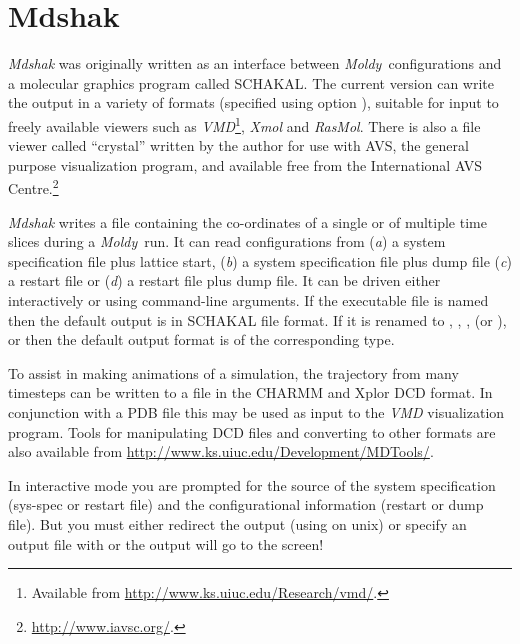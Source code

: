 \documentclass[a4paper,twoside]{report}
\newcommand{\moldy}{\emph{Moldy}}
\begin{document}
\section{Mdshak}%
\emph{Mdshak} was originally written as an interface between \moldy\ 
configurations and a molecular graphics program called
SCHAKAL\cite{schakal:88}.  The current version can write the output in
a variety of formats (specified using option \Lit{-f}), suitable
for input to freely available viewers such as
\emph{VMD}\footnote{Available from
  \url{http://www.ks.uiuc.edu/Research/vmd/}.}, \emph{Xmol} and
\emph{RasMol}.  There is also a file viewer called
``crystal'' written by the author for use with AVS, the general
purpose visualization program, and available free from the
International AVS Centre.\footnote{\url{http://www.iavsc.org/}.}

\emph{Mdshak} writes a file containing the co-ordinates of a
single or of multiple time slices during a \moldy\ run.  It can read
configurations from (\emph{a}) a system specification file plus
lattice start, (\emph{b}) a system specification file plus dump file
(\emph{c}) a restart file or (\emph{d}) a restart file plus dump file.
It can be driven either interactively or using command-line arguments.
If the executable file is named \Fname{mdshak} then the default output
is in SCHAKAL file format. If it is renamed to \Fname{mdxyz},
, ,  (or ),
\Fname{mdarc} or \Fname{mdxtl} then the default output format
is of the corresponding type.

To assist in making animations of a simulation, the trajectory from
many timesteps can be written to a file in the  CHARMM and Xplor DCD
format.  In conjunction with a PDB file
this may be used as input to the \emph{VMD} visualization program.  Tools for
manipulating DCD files and converting to other formats are also
available from \url{http://www.ks.uiuc.edu/Development/MDTools/}.

In interactive mode you are prompted for the source of the system
specification (sys-spec or restart file) and the configurational
information (restart or dump file).  But you must either redirect the
output (using \Lit{>} on unix) or specify an output file with \Lit{-o}
or the output will go to the screen!
\end{document}
